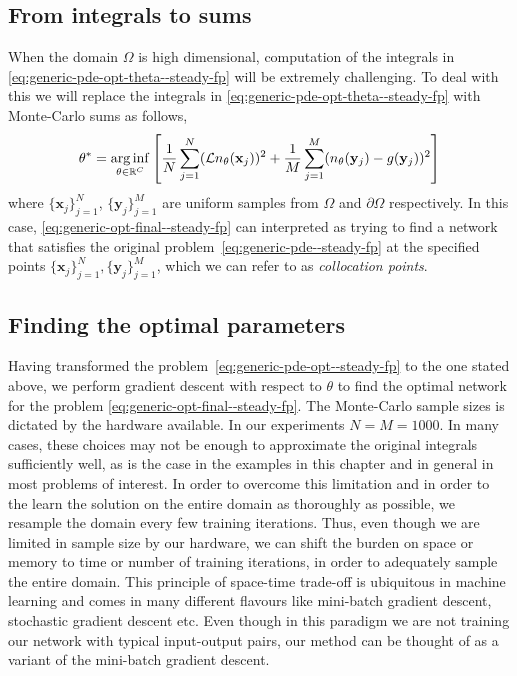 \subsection{From integrals to sums} 
When the domain $\Omega$ is high dimensional, computation of the integrals in \eqref{eq:generic-pde-opt-theta--steady-fp} will be extremely challenging. To deal with this we will replace the integrals in \eqref{eq:generic-pde-opt-theta--steady-fp} with Monte-Carlo sums as follows,
\begin{align}
    \theta^* = \underset{\theta\in\mathbb R^C}{\rm arg\,inf}\left[\frac{1}{N}\sum_{j=1}^N (\mathcal L n_\theta(\mathbf x_j))^2 + \frac{1}{M}\sum_{j=1}^M(n_\theta(\mathbf y_j)-g(\mathbf y_j))^2\right]\label{eq:generic-opt-final--steady-fp}
\end{align}
where $\{\mathbf x_j\}_{j=1}^N$, $\{\mathbf y_j\}_{j=1}^M$ are uniform samples from $\Omega$ and $\partial \Omega$ respectively. In this case, \eqref{eq:generic-opt-final--steady-fp} can interpreted as trying to find a network that satisfies the original problem~\eqref{eq:generic-pde--steady-fp} at the specified points $\{\mathbf x_j\}_{j=1}^N, \{\mathbf y_j\}_{j=1}^M$, which we can refer to as \textit{collocation points}. 

\subsection{Finding the optimal parameters}\label{ssec-finding-theta--steady-fp}
Having transformed the problem~\eqref{eq:generic-pde-opt--steady-fp} to the one stated above, we perform gradient descent with respect to $\theta$ to find the optimal network for the problem \eqref{eq:generic-opt-final--steady-fp}. The Monte-Carlo sample sizes is dictated by the hardware available.  In our experiments $N = M = 1000$. In many cases, these choices may not be enough to approximate the original integrals sufficiently well, as is the case in the examples in this chapter and in general in most problems of interest. In order to overcome this limitation and in order to the learn the solution on the entire domain as thoroughly as possible, we resample the domain every few training iterations. Thus, even though we are limited in sample size by our hardware, we can shift the burden on space or memory to time or number of training iterations, in order to adequately sample the entire domain. This principle of space-time trade-off is ubiquitous in machine learning \cite{buduma2022fundamentals} and comes in many different flavours like mini-batch gradient descent, stochastic gradient descent etc. Even though in this paradigm we are not training our network with typical input-output pairs, our method can be thought of as a variant of the mini-batch gradient descent.

